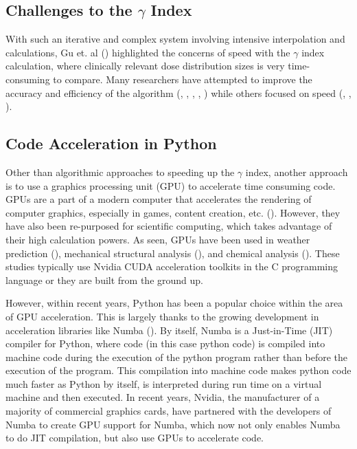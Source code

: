 \documentclass[12pt]{article}
\begin{document}
\subsection{Challenges to the $\gamma$ Index}
With such an iterative and complex system involving intensive interpolation and calculations, Gu et. al (\textcite{Gu}) highlighted the concerns of speed with the $\gamma$ index calculation, where clinically relevant dose distribution sizes is very time-consuming to compare. Many researchers have attempted to improve the accuracy and efficiency of the algorithm (\textcite{Bakai}, \textcite{Depuydt}, \textcite{Stock}, \textcite{Jiang}, \textcite{Spezi}) while others focused on speed (\textcite{Ju}, \textcite{Chen}, \textcite{Wendling}).

\subsection{Code Acceleration in Python}
Other than algorithmic approaches to speeding up the $\gamma$ index, another approach is to use a graphics processing unit (GPU) to accelerate time consuming code. GPUs are a part of a modern computer that accelerates the rendering of computer graphics, especially in games, content creation, etc. (\textcite{intel}). However, they have also been re-purposed for scientific computing, which takes advantage of their high calculation powers. As seen, GPUs have been used in weather prediction (\textcite{Michalakes}), mechanical structural analysis (\textcite{Georgescu}), and chemical analysis (\textcite{Ma}). These studies typically use Nvidia CUDA acceleration toolkits in the C programming language or they are built from the ground up.

However, within recent years, Python has been a popular choice within the area of GPU acceleration. This is largely thanks to the growing development in acceleration libraries like Numba (\textcite{Lam}). By itself, Numba is a Just-in-Time (JIT) compiler for Python, where code (in this case python code) is compiled into machine code during the execution of the python program rather than before the execution of the program. This compilation into machine code makes python code much faster as Python by itself, is interpreted during run time on a virtual machine and then executed. In recent years, Nvidia, the manufacturer of a majority of commercial graphics cards, have partnered with the developers of Numba to create GPU support for Numba, which now not only enables Numba to do JIT compilation, but also use GPUs to accelerate code.
\end{document}

